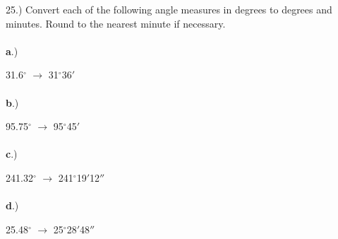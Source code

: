 \documentclass[12pt]{article}
\begin{document}
{\setlength{\parindent}{0cm}
25.) Convert each of the following angle measures in degrees to degrees and minutes. Round to the nearest minute if necessary.
\paragraph{}\textbf{a}.) \begin{center} 31.6$^{\circ}$ $\longrightarrow$ 31$^{\circ}$36$'$\end{center}
\paragraph{}\textbf{b}.) \begin{center}  95.75$^{\circ}$ $\longrightarrow$ 95$^{\circ}$45$'$ \end{center}
\paragraph{}\textbf{c}.) \begin{center} 241.32$^{\circ}$ $\longrightarrow$ 241$^{\circ}$19$'$12$''$ \end{center}
\paragraph{}\textbf{d}.) \begin{center} 25.48$^{\circ}$ $\longrightarrow$ 25$^{\circ}$28$'$48$''$ \end{center}
}
\end{document}
